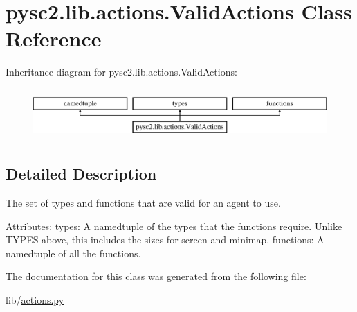 \hypertarget{classpysc2_1_1lib_1_1actions_1_1_valid_actions}{}\section{pysc2.\+lib.\+actions.\+Valid\+Actions Class Reference}
\label{classpysc2_1_1lib_1_1actions_1_1_valid_actions}
Inheritance diagram for pysc2.\+lib.\+actions.\+Valid\+Actions\+:\begin{figure}[H]
\begin{center}
\leavevmode
\includegraphics[height=1.964912cm]{classpysc2_1_1lib_1_1actions_1_1_valid_actions}
\end{center}
\end{figure}


\subsection{Detailed Description}
\begin{DoxyVerb}The set of types and functions that are valid for an agent to use.

Attributes:
  types: A namedtuple of the types that the functions require. Unlike TYPES
      above, this includes the sizes for screen and minimap.
  functions: A namedtuple of all the functions.
\end{DoxyVerb}
 

The documentation for this class was generated from the following file\+:\begin{DoxyCompactItemize}
\item 
lib/\mbox{\hyperlink{actions_8py}{actions.\+py}}\end{DoxyCompactItemize}
